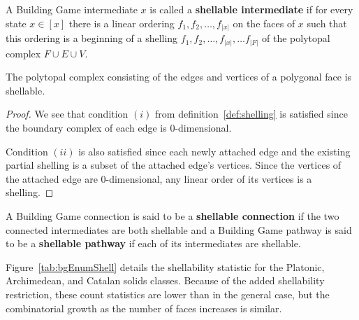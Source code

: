 \begin{mydef}
A Building Game intermediate $x$ is called a \textbf{shellable intermediate} if for every state $x \in [x]$ there is a linear ordering $f_1, f_2, \dots, f_{|x|}$ on the faces of $x$ such that this ordering is a beginning of a shelling $f_1, f_2, \dots, f_{|x|}, \dots f_{|F|}$ of the polytopal complex $F\cup E\cup V$.
\end{mydef}

\begin{mylem}
The polytopal complex consisting of the edges and vertices of a polygonal face is shellable.
\end{mylem}
\begin{proof}
We see that condition $(i)$ from definition~\ref{def:shelling} is satisfied since the boundary complex of each edge is $0$-dimensional.

Condition $(ii)$ is also satisfied since each newly attached edge and the existing partial shelling is a subset of the attached edge's vertices. Since the vertices of the attached edge are $0$-dimensional, any linear order of its vertices is a shelling.
\end{proof}



\begin{mydef}
A Building Game connection is said to be a \textbf{shellable connection} if the two connected intermediates are both shellable and a Building Game pathway is said to be a \textbf{shellable pathway} if each of its intermediates are shellable.
\end{mydef}

Figure~\ref{tab:bgEnumShell} details the shellability statistic for the Platonic, Archimedean, and Catalan solids classes. Because of the added shellability restriction, these count statistics are lower than in the general case, but the combinatorial growth as the number of faces increases is similar.  


